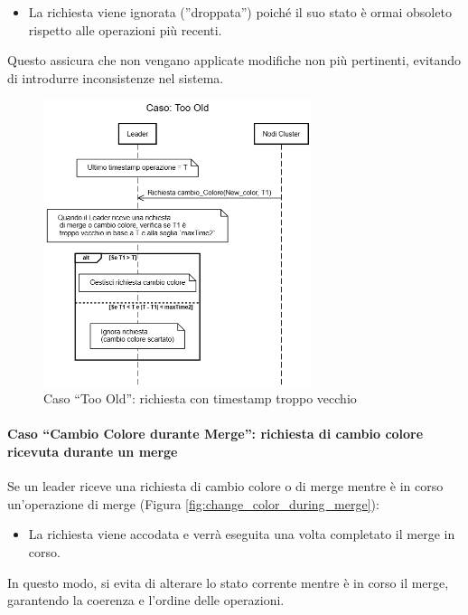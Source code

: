 \documentclass[12pt, a4paper]{report}
\begin{document}
\begin{itemize}
    \item La richiesta viene ignorata (''droppata'') poiché il suo stato è ormai obsoleto rispetto alle operazioni più recenti.
\end{itemize}

Questo assicura che non vengano applicate modifiche non più pertinenti, evitando di introdurre inconsistenze nel sistema.

\begin{figure}[H]
    \centering
    \includegraphics[width=0.70\textwidth,align=t]{images/concorrenza/too_old.png}
    \caption{Caso ``Too Old'': richiesta con timestamp troppo vecchio}
    \label{fig:caso_too_old}
\end{figure}

\newpage
\paragraph{Caso ``Cambio Colore durante Merge'': richiesta di cambio colore ricevuta durante un merge}\label{par:change_color_during_merge}

Se un leader riceve una richiesta di cambio colore o di merge mentre è in corso un'operazione di merge (Figura \ref{fig:change_color_during_merge}):

\begin{itemize}
    \item La richiesta viene accodata e verrà eseguita una volta completato il merge in corso.
\end{itemize}

In questo modo, si evita di alterare lo stato corrente mentre è in corso il merge, garantendo la coerenza e l'ordine delle operazioni.
\end{document}
